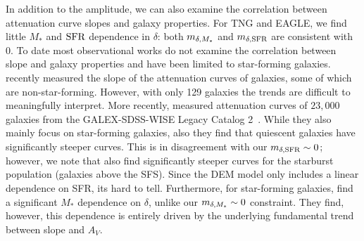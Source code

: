 In addition to the amplitude, we can also examine the correlation between
attenuation curve slopes and galaxy properties. For TNG and EAGLE, we find
little $M_*$ and ${\rm SFR}$ dependence in $\delta$: both $m_{\delta,M_*}$ and $m_{\delta,{\rm SFR}}$
are consistent with 0. To date most observational works do not examine the
correlation between slope and galaxy properties and have been limited to
star-forming galaxies. \cite{leja2017} recently measured the slope of the 
attenuation curves of galaxies, some of which are non-star-forming. However,
with only 129 galaxies the trends are difficult to meaningfully interpret.
More recently, \cite{salim2018} measured attenuation curves of $23,000$ 
galaxies from the GALEX-SDSS-WISE Legacy Catalog 2~\citep[GSWLC2;][]{salim2019}. While they
also mainly focus on star-forming galaxies, \cite{salim2018} also they find 
that quiescent galaxies have significantly steeper curves. This is in
disagreement with our $m_{\delta,{\rm SFR}}\sim0$; however, we note that \cite{salim2018} 
also find significantly steeper curves for the starburst population 
(galaxies above the SFS).
Since the DEM model only includes a linear dependence
on SFR, its hard to tell. Furthermore, for star-forming galaxies,
\cite{salim2018} find a significant $M_*$ dependence on $\delta$, unlike our
$m_{\delta,M_*}\sim0$ constraint. They find, however, this dependence is entirely
driven by the underlying fundamental trend between slope and $A_V$.

